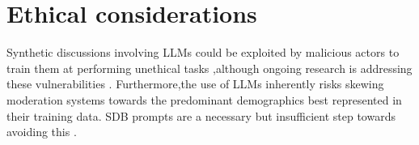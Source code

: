 %
\section{Ethical considerations} 
Synthetic discussions involving LLMs could be exploited by malicious actors to train them at performing unethical tasks \cite{majumdar_2024_nefarious,MARULLI20245340,li_2025_vulnerable},although ongoing research is addressing these vulnerabilities \cite{wang_2025_risk}. Furthermore,the use of LLMs inherently risks skewing moderation systems towards the predominant demographics best represented in their training data. SDB prompts are a necessary but insufficient step towards avoiding this \cite{rossi_2024,anthis_2025,burton2024large}.